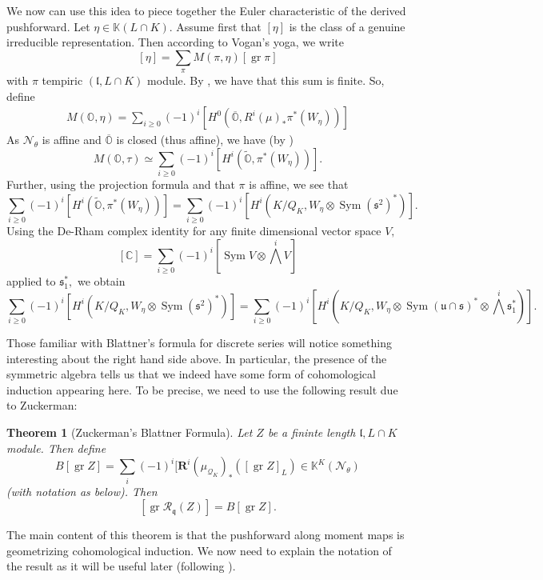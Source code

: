\documentclass[letterpaper,twosided,11pt]{article}
\theoremstyle{plain}
\newtheorem{theorem}{Theorem}[section]
\theoremstyle{definition}
\theoremstyle{remark}
\newcommand{\C}{\mathbb{C}}
\newcommand{\OO}{\mathbb{O}}
\newcommand{\close}[1]{\overline{#1}}
\newcommand{\tensor}{\otimes}
\newcommand{\Sym}{\operatorname{Sym}}
\newcommand{\lie}[1]{\mathfrak{#1}}
\newcommand{\gr}{\operatorname{gr }}
\begin{document}
We now can use this idea to piece together the Euler characteristic of the derived pushforward. Let $\eta\in \mathbb{K}(L\cap K).$ Assume first that $[\eta]$ is the class of a genuine irreducible representation. Then according to Vogan's yoga, we write \[ [\eta]=\sum_{\pi} M(\pi, \eta)[\gr \pi] \]
with $\pi$ tempiric $(\lie{l},L\cap K)$ module. By \cite[Theorem 16.6]{Vogan2007}, we have that this sum is finite. So, define \begin{align*} M(\mathbb{O},\eta)=\sum_{i\geq 0} (-1)^i [H^0(\close{\OO},R^i (\mu)_*\pi^*(W_\eta) )] \end{align*}
As $\mathcal{N}_\theta$ is affine and $\close{\OO}$ is closed (thus affine), we have (by \cite[Proposition 8.5]{Hartshorne1977}) \[ M(\mathbb{O},\tau)\simeq \sum_{i\geq 0} (-1)^i [H^i(\widetilde{\OO},\pi^*(W_\eta) )] .\]
Further, using the projection formula \cite[\href{https://stacks.math.columbia.edu/tag/01E8}{Lemma 01E8}]{stacks-project} and that $\pi$ is affine, we see that \[ \sum_{i\geq 0} (-1)^i [H^i(\widetilde{\OO},\pi^*(W_\eta) )] = \sum_{i\geq 0} (-1)^i [H^i(K/Q_K,W_\eta \tensor \Sym(\lie{s}^2)^*)].\]
Using the De-Rham complex identity for any finite dimensional vector space $V,$ \[ [\C]=\sum_{i\geq 0} (-1)^i [\Sym V \tensor \textstyle{\bigwedge^i}V]\]
applied to $\lie{s}_1^*,$ we obtain   
  \[ \sum_{i\geq 0} (-1)^i [H^i(K/Q_K,W_\eta \tensor \Sym(\lie{s}^2)^*)]=\sum_{i\geq 0} (-1)^i [H^i(K/Q_K,W_\eta \tensor \Sym(\lie{u}\cap \lie{s})^*\tensor \textstyle{\bigwedge^i \lie{s}_1^*})] .\]
  

Those familiar with Blattner's formula for discrete series will notice something interesting about the right hand side above. In particular, the presence of the symmetric algebra tells us that we indeed have some form of cohomological induction appearing here. To be precise, we need to use the following result due to Zuckerman:

\begin{theorem}[Zuckerman's Blattner Formula]\cite[pg. 151]{Vogan1987}
	Let $Z$ be a fininte length $\lie{l},L\cap K$ module. Then define \[ B[\gr Z]=\sum_{i} (-1)^i[\textbf{R}^i(\mu_{\mathcal{Q}_K})_*([\gr Z]_L)\in \mathbb{K}^K(\mathcal{N}_\theta)\] (with notation as below). 
	Then \[ [\gr \mathcal{R}_\lie{q}(Z)]=B[\gr Z]. \]
\end{theorem} 

The main content of this theorem is that the pushforward along moment maps is geometrizing cohomological induction. We now need to explain the notation of the result as it will be useful later (following \cite[Section 11]{AdamsVogan2021}).   
\end{document}
